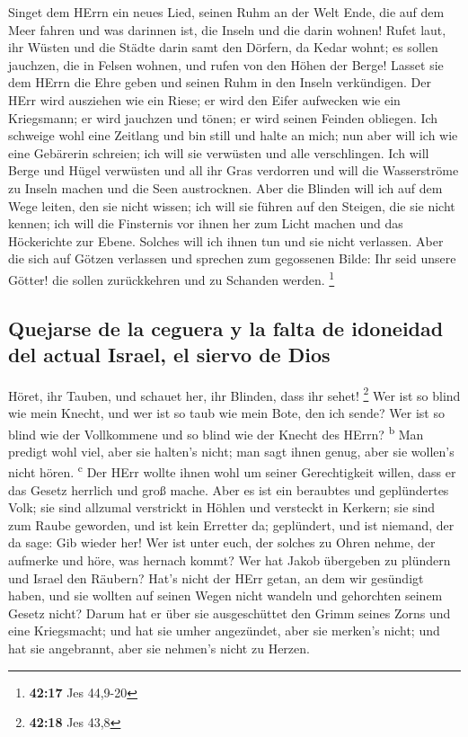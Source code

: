  Singet dem HErrn ein neues Lied, seinen Ruhm an der Welt
Ende, die auf dem Meer fahren und was darinnen ist, die Inseln und die
darin wohnen!  Rufet laut, ihr Wüsten und die Städte
darin samt den Dörfern, da Kedar wohnt; es sollen jauchzen, die in
Felsen wohnen, und rufen von den Höhen der Berge!  Lasset
sie dem HErrn die Ehre geben und seinen Ruhm in den Inseln verkündigen.
 Der HErr wird ausziehen wie ein Riese; er wird den Eifer
aufwecken wie ein Kriegsmann; er wird jauchzen und tönen; er wird seinen
Feinden obliegen.  Ich schweige wohl eine Zeitlang und
bin still und halte an mich; nun aber will ich wie eine Gebärerin
schreien; ich will sie verwüsten und alle verschlingen. 
Ich will Berge und Hügel verwüsten und all ihr Gras verdorren und will
die Wasserströme zu Inseln machen und die Seen austrocknen.
 Aber die Blinden will ich auf dem Wege leiten, den sie
nicht wissen; ich will sie führen auf den Steigen, die sie nicht kennen;
ich will die Finsternis vor ihnen her zum Licht machen und das
Höckerichte zur Ebene. Solches will ich ihnen tun und sie nicht
verlassen.  Aber die sich auf Götzen verlassen und
sprechen zum gegossenen Bilde: Ihr seid unsere Götter! die sollen
zurückkehren und zu Schanden werden. \footnote{\textbf{42:17} Jes
  44,9-20}

\hypertarget{quejarse-de-la-ceguera-y-la-falta-de-idoneidad-del-actual-israel-el-siervo-de-dios}{%
\subsection{Quejarse de la ceguera y la falta de idoneidad del actual
Israel, el siervo de
Dios}\label{quejarse-de-la-ceguera-y-la-falta-de-idoneidad-del-actual-israel-el-siervo-de-dios}}

 Höret, ihr Tauben, und schauet her, ihr Blinden, dass
ihr sehet! \footnote{\textbf{42:18} Jes 43,8}  Wer ist so
blind wie mein Knecht, und wer ist so taub wie mein Bote, den ich sende?
Wer ist so blind wie der Vollkommene und so blind wie der Knecht des
HErrn? \textsuperscript{b}  Man predigt wohl viel, aber
sie halten's nicht; man sagt ihnen genug, aber sie wollen's nicht hören.
\textsuperscript{c}  Der HErr wollte ihnen wohl um seiner
Gerechtigkeit willen, dass er das Gesetz herrlich und groß mache.
 Aber es ist ein beraubtes und geplündertes Volk; sie
sind allzumal verstrickt in Höhlen und versteckt in Kerkern; sie sind
zum Raube geworden, und ist kein Erretter da; geplündert, und ist
niemand, der da sage: Gib wieder her!  Wer ist unter
euch, der solches zu Ohren nehme, der aufmerke und höre, was hernach
kommt?  Wer hat Jakob übergeben zu plündern und Israel
den Räubern? Hat's nicht der HErr getan, an dem wir gesündigt haben, und
sie wollten auf seinen Wegen nicht wandeln und gehorchten seinem Gesetz
nicht?  Darum hat er über sie ausgeschüttet den Grimm
seines Zorns und eine Kriegsmacht; und hat sie umher angezündet, aber
sie merken's nicht; und hat sie angebrannt, aber sie nehmen's nicht zu
Herzen.

